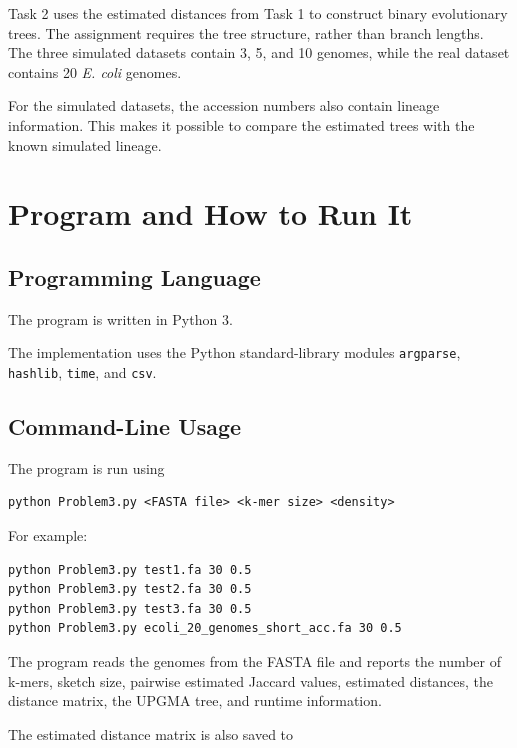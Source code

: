 \documentclass[11pt,a4paper]{article}
\begin{document}
Task 2 uses the estimated distances from Task 1 to construct binary
evolutionary trees. The assignment requires the tree structure, rather than
branch lengths. The three simulated datasets contain 3, 5, and 10 genomes,
while the real dataset contains 20 \textit{E. coli} genomes.

For the simulated datasets, the accession numbers also contain lineage
information. This makes it possible to compare the estimated trees with the
known simulated lineage.


\section{Program and How to Run It}

\subsection{Programming Language}

The program is written in Python 3.

The implementation uses the Python standard-library modules
\texttt{argparse}, \texttt{hashlib}, \texttt{time}, and \texttt{csv}.

\subsection{Command-Line Usage}

The program is run using

\begin{lstlisting}
python Problem3.py <FASTA file> <k-mer size> <density>
\end{lstlisting}

For example:

\begin{lstlisting}
python Problem3.py test1.fa 30 0.5
python Problem3.py test2.fa 30 0.5
python Problem3.py test3.fa 30 0.5
python Problem3.py ecoli_20_genomes_short_acc.fa 30 0.5
\end{lstlisting}

The program reads the genomes from the FASTA file and reports the number of
k-mers, sketch size, pairwise estimated Jaccard values, estimated distances,
the distance matrix, the UPGMA tree, and runtime information.

The estimated distance matrix is also saved to
\end{document}
